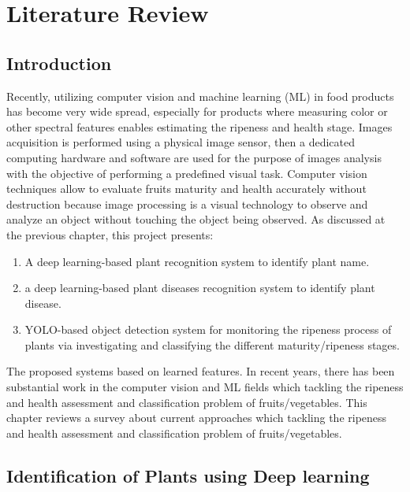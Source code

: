 \chapter{Literature Review}


\section{Introduction}

Recently, utilizing computer vision and machine learning (ML) in food 
products has become very wide spread, especially for products where 
measuring color or other spectral features enables estimating the ripeness 
and health stage. Images acquisition is performed using a physical image 
sensor, then a dedicated computing hardware and software are used for the 
purpose of images analysis with the objective of performing a predefined 
visual task. Computer vision techniques allow to evaluate fruits maturity 
and health accurately without destruction because image processing is a 
visual technology to observe and analyze an object without touching the 
object being observed. As discussed at the previous chapter, this project 
presents:
\begin{enumerate}
    \item A deep learning-based plant recognition system to identify plant name.
    \item a deep learning-based plant diseases recognition system to identify plant disease.
    \item YOLO-based object detection system for monitoring the ripeness process of 
        plants via investigating and classifying the different maturity/ripeness stages.
\end{enumerate}
The proposed systems based on learned features. In recent years, 
there has been substantial work in the computer vision and ML fields
which tackling the ripeness and health assessment and classification problem
of fruits/vegetables. This chapter reviews a survey about current approaches which 
tackling the ripeness and health assessment and classification problem of fruits/vegetables.


\section{Identification of Plants using Deep learning}

